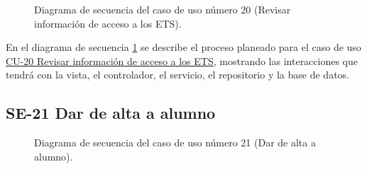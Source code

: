 \begin{figure}[htbp!]
	\begin{center}
		\caption{Diagrama de secuencia del caso de uso número 20 (Revisar información de acceso a los ETS).}
		\label{fig:Diagrama de secuencia CU-20}
	\end{center}
\end{figure}

En el diagrama de secuencia \ref{fig:Diagrama de secuencia CU-20} se describe el proceso planeado para el caso de uso \hyperlink{CU-20}{CU-20 Revisar información de acceso a los ETS}, mostrando las interacciones que tendrá con la vista, el controlador, el servicio, el repositorio y la base de datos.

\newpage

\subsection{SE-21 Dar de alta a alumno}

\begin{figure}[htbp!]
	\begin{center}
		\caption{Diagrama de secuencia del caso de uso número 21 (Dar de alta a alumno).}
		\label{fig:Diagrama de secuencia CU-21}
	\end{center}
\end{figure}

